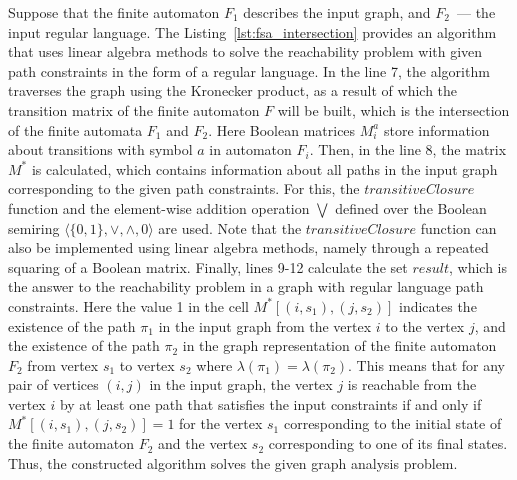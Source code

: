 Suppose that the finite automaton $F_1$ describes the input graph, and $F_2$~--- the input regular language. The Listing~\ref{lst:fsa_intersection} provides an algorithm that uses linear algebra methods to solve the reachability problem with given path constraints in the form of a regular language. In the line 7, the algorithm traverses the graph using the Kronecker product, as a result of which the transition matrix of the finite automaton $F$ will be built, which is the intersection of the finite automata $F_1$ and $F_2$. Here Boolean matrices $M_i^a$ store information about transitions with symbol $a$ in automaton $F_i$. Then, in the line 8, the matrix $M^*$ is calculated, which contains information about all paths in the input graph corresponding to the given path constraints. For this, the $\textit{transitiveClosure}$ function and the element-wise addition operation $\bigvee$ defined over the Boolean semiring $\langle \{0, 1\}, \vee, \wedge, 0 \rangle$ are used. Note that the $\textit{transitiveClosure}$ function can also be implemented using linear algebra methods, namely through a repeated squaring of a Boolean matrix. Finally, lines 9-12 calculate the set $\textit{result}$, which is the answer to the reachability problem in a graph with regular language path constraints. Here the value 1 in the cell $M^*[(i, s_1), (j, s_2)]$ indicates the existence of the path $\pi_1$ in the input graph from the vertex $i$ to the vertex $j$, and the existence of the path $\pi_2$ in the graph representation of the finite automaton $F_2$ from vertex $s_1$ to vertex $s_2$ where $\lambda(\pi_1) = \lambda(\pi_2)$. This means that for any pair of vertices $(i, j)$ in the input graph, the vertex $j$ is reachable from the vertex $i$ by at least one path that satisfies the input constraints if and only if $M^*[(i, s_1), (j, s_2)] = 1$ for the vertex $s_1$ corresponding to the initial state of the finite automaton $F_2$ and the vertex $s_2$ corresponding to one of its final states. Thus, the constructed algorithm solves the given graph analysis problem.


